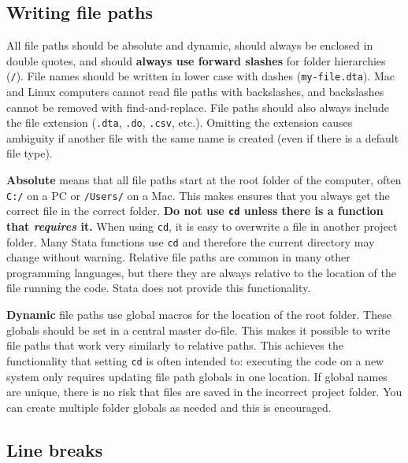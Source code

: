 
\subsection{Writing file paths}

All file paths should be absolute and dynamic,
should always be enclosed in double quotes,
and should \textbf{always use forward slashes} for folder hierarchies (\texttt{/}).
File names should be written in lower case with dashes (\texttt{my-file.dta}).
Mac and Linux computers cannot read file paths with backslashes,
and backslashes cannot be removed with find-and-replace.
File paths should also always include the file extension
(\texttt{.dta}, \texttt{.do}, \texttt{.csv}, etc.).
Omitting the extension causes ambiguity
if another file with the same name is created
(even if there is a default file type).

\textbf{Absolute} means that all file paths start at the root folder of the computer,
often \texttt{C:/} on a PC or \texttt{/Users/} on a Mac.
This makes ensures that you always get the correct file in the correct folder.
\textbf{Do not use \texttt{cd} unless there is a function that \textit{requires} it.}
When using \texttt{cd}, it is easy to overwrite a file in another project folder.
Many Stata functions use \texttt{cd} and therefore the current directory may change without warning.
Relative file paths are common in many other programming languages,
but there they are always relative to the location of the file running the code.
Stata does not provide this functionality.

\textbf{Dynamic} file paths use global macros for the location of the root folder.
These globals should be set in a central master do-file.
This makes it possible to write file paths that work very similarly to relative paths.
This achieves the functionality that setting \texttt{cd} is often intended to:
executing the code on a new system only requires updating file path globals in one location.
If global names are unique, there is no risk that files are saved in the incorrect project folder.
You can create multiple folder globals as needed and this is encouraged.


\subsection{Line breaks}

